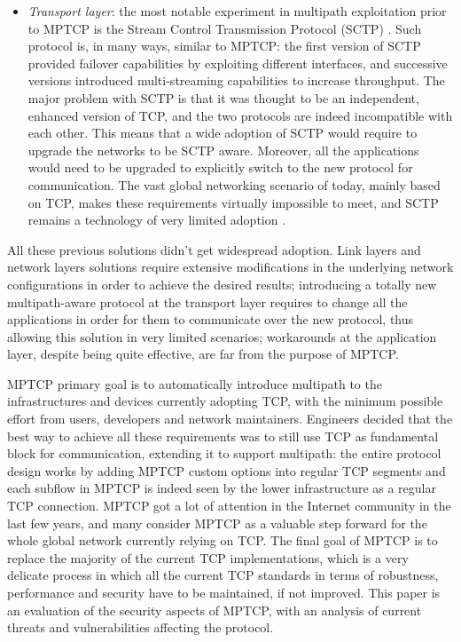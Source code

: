 \begin{itemize}
  \item \textit{Transport layer}: the most notable experiment in multipath exploitation prior to MPTCP is the Stream Control Transmission Protocol (SCTP) \cite{rfc4960}. Such protocol is, in many ways, similar to MPTCP: the first version of SCTP provided failover capabilities by exploiting different interfaces, and successive versions introduced multi-streaming capabilities to increase throughput. The major problem with SCTP is that it was thought to be an independent, enhanced version of TCP, and the two protocols are indeed incompatible with each other. This means that a wide adoption of SCTP would require to upgrade the networks to be SCTP aware. Moreover, all the applications would need to be upgraded to explicitly switch to the new protocol for communication. The vast global networking scenario of today, mainly based on TCP, makes these requirements virtually impossible to meet, and SCTP remains a technology of very limited adoption \cite{ipspace}.
\end{itemize}

All these previous solutions didn't get widespread adoption. Link layers and network layers solutions require extensive modifications in the underlying network configurations in order to achieve the desired results; introducing a totally new multipath-aware protocol at the transport layer requires to change all the applications in order for them to communicate over the new protocol, thus allowing this solution in very limited scenarios; workarounds at the application layer, despite being quite effective, are far from the purpose of MPTCP.

MPTCP primary goal is to automatically introduce multipath to the infrastructures and devices currently adopting TCP, with the minimum possible effort from users, developers and network maintainers. Engineers decided that the best way to achieve all these requirements was to still use TCP as fundamental block for communication, extending it to support multipath: the entire protocol design works by adding MPTCP custom options into regular TCP segments and each subflow in MPTCP is indeed seen by the lower infrastructure as a regular TCP connection.
MPTCP got a lot of attention in the Internet community in the last few years, and many consider MPTCP as a valuable step forward for the whole global network currently relying on TCP.
The final goal of MPTCP is to replace the majority of the current TCP implementations, which is a very delicate process in which all the current TCP standards in terms of robustness, performance and security have to be maintained, if not improved. This paper is an evaluation of the security aspects of MPTCP, with an analysis of current threats and vulnerabilities affecting the protocol.

